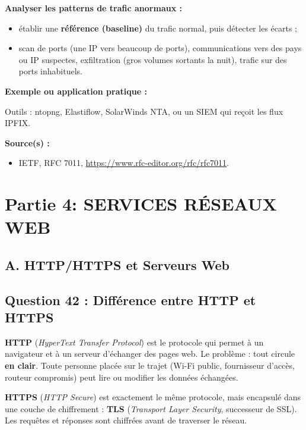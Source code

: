 \documentclass[12pt,a4paper]{article}
\newcommand{\exemple}{\textbf{Exemple ou application pratique :}\par}
\newcommand{\sources}{\textbf{Source(s) :}}
\begin{document}
\textbf{Analyser les patterns de trafic anormaux :}
\begin{itemize}
    \item établir une \textbf{référence (baseline)} du trafic normal,
    puis détecter les écarts ;
    \item scan de ports (une IP vers beaucoup de ports), communications
    vers des pays ou IP suspectes, exfiltration (gros volumes sortants la
    nuit), trafic sur des ports inhabituels.
\end{itemize}

\exemple
Outils : ntopng, Elastiflow, SolarWinds NTA, ou un SIEM qui reçoit les
flux IPFIX.

\sources
\begin{itemize}
    \item IETF, RFC 7011, \url{https://www.rfc-editor.org/rfc/rfc7011}.
\end{itemize}


\section{Partie 4: SERVICES RÉSEAUX WEB }
\subsection*{A. HTTP/HTTPS et Serveurs Web}
\subsection*{Question 42 : Diff\'erence entre HTTP et HTTPS}

\textbf{HTTP} (\textit{HyperText Transfer Protocol}) est le protocole qui permet \`a un navigateur et \`a un serveur d'\'echanger des pages web. Le probl\`eme : tout circule \textbf{en clair}. Toute personne plac\'ee sur le trajet (Wi-Fi public, fournisseur d'acc\`es, routeur compromis) peut lire ou modifier les donn\'ees \'echang\'ees.

\textbf{HTTPS} (\textit{HTTP Secure}) est exactement le m\^eme protocole, mais encapsul\'e dans une couche de chiffrement : \textbf{TLS} (\textit{Transport Layer Security}, successeur de SSL). Les requ\^etes et r\'eponses sont chiffr\'ees avant de traverser le r\'eseau.
\end{document}
